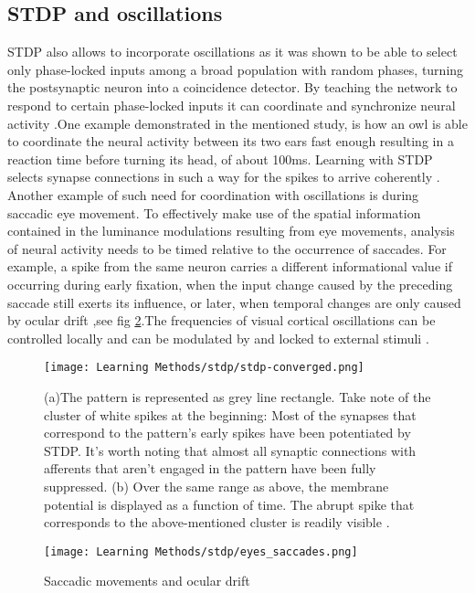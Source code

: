 \documentclass[12pt]{report}
\begin{document}
\subsection{STDP and oscillations}

STDP also allows to incorporate oscillations as it was shown to be able to select only phase-locked inputs among a broad population with random phases, turning the postsynaptic neuron into a coincidence detector. By teaching the network to respond to certain phase-locked inputs it can coordinate and synchronize neural activity \cite{Gerstner1996}.One example demonstrated in the mentioned study, is how an owl is able to coordinate the neural activity between its two ears fast enough resulting in a reaction time before turning its head, of about 100ms. Learning with STDP selects synapse connections in such a way for the spikes to arrive coherently . Another example of such need for coordination with oscillations is during saccadic eye movement.  To effectively make use of the spatial information contained in the luminance modulations resulting from eye movements, analysis of neural activity needs to be timed relative to the occurrence of saccades. For example, a spike from the same neuron carries a different informational value if occurring during early fixation, when the input change caused by the preceding saccade still exerts its influence, or later, when temporal changes are only caused by ocular drift \cite{Rucci2018},see fig \ref{fig:eyes_saccades}.The frequencies of visual cortical oscillations can be controlled locally  and  can  be  modulated  by  and locked to external stimuli \cite{Ahissar2012}.


\begin{figure}[htp]
    \centering
    \texttt{[image: Learning Methods/stdp/stdp-converged.png]}
    \caption{(a)The pattern is represented as grey line rectangle. Take note of the cluster of white spikes at the beginning: Most of the synapses that correspond to the pattern's early spikes have been potentiated by STDP. It's worth noting that almost all synaptic connections with afferents that aren't engaged in the pattern have been fully suppressed. (b) Over the same range as above, the membrane potential is displayed as a function of time. The abrupt spike that corresponds to the above-mentioned cluster is readily visible \cite{Masquelier2008}. 
    \label{fig:stdp-converged}}
\end{figure}

\begin{figure}[htp]
    \centering
    \texttt{[image: Learning Methods/stdp/eyes\_saccades.png]}
    \caption{Saccadic movements and ocular drift}
    \label{fig:eyes_saccades}
\end{figure}
\end{document}
